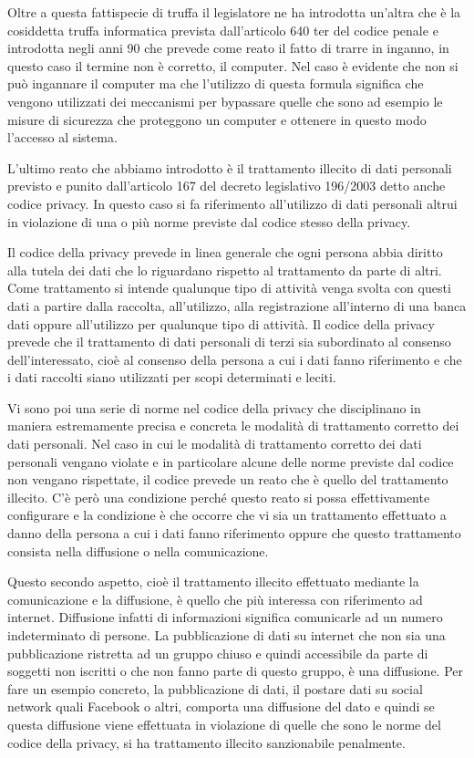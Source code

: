 Oltre a questa fattispecie di truffa il legislatore ne ha introdotta un'altra che è la cosiddetta truffa informatica prevista dall'articolo 640 ter del codice penale e introdotta negli anni 90 che prevede come reato il fatto di trarre in inganno, in questo caso il termine non è corretto, il computer. Nel caso è evidente che non si può ingannare il computer ma che l'utilizzo di questa formula significa che vengono utilizzati dei meccanismi per bypassare quelle che sono ad esempio le misure di sicurezza che proteggono un computer e ottenere in questo modo l'accesso al sistema.\par
L'ultimo reato che abbiamo introdotto è il trattamento illecito di dati personali previsto e punito dall'articolo 167 del decreto legislativo 196/2003 detto anche codice privacy. In questo caso si fa riferimento all'utilizzo di dati personali altrui in violazione di una o più norme previste dal codice stesso della privacy.\par
Il codice della privacy prevede in linea generale che ogni persona abbia diritto alla tutela dei dati che lo riguardano rispetto al trattamento da parte di altri. Come trattamento si intende qualunque tipo di attività venga svolta con questi dati a partire dalla raccolta, all'utilizzo, alla registrazione all'interno di una banca dati oppure all'utilizzo per qualunque tipo di attività. Il codice della privacy prevede che il trattamento di dati personali di terzi sia subordinato al consenso dell'interessato, cioè al consenso della persona a cui i dati fanno riferimento e che i dati raccolti siano utilizzati per scopi determinati e leciti. \par
Vi sono poi una serie di norme nel codice della privacy che disciplinano in maniera estremamente precisa e concreta le modalità di trattamento corretto dei dati personali. Nel caso in cui le modalità di trattamento corretto dei dati personali vengano violate e in particolare alcune delle norme previste dal codice non vengano rispettate, il codice prevede un reato che è quello del trattamento illecito. C'è però una condizione perché questo reato si possa effettivamente configurare e la condizione è che occorre che vi sia un trattamento effettuato a danno della persona a cui i dati fanno riferimento oppure che questo trattamento consista nella diffusione o nella comunicazione.\par
Questo secondo aspetto, cioè il trattamento illecito effettuato mediante la comunicazione e la diffusione, è quello che più interessa con riferimento ad internet. Diffusione infatti di informazioni significa comunicarle ad un numero indeterminato di persone. La pubblicazione di dati su internet che non sia una pubblicazione ristretta ad un gruppo chiuso e quindi accessibile da parte di soggetti non iscritti o che non fanno parte di questo gruppo, è una diffusione. Per fare un esempio concreto, la pubblicazione di dati, il postare dati su social network quali Facebook o altri, comporta una diffusione del dato e quindi se questa diffusione viene effettuata in violazione di quelle che sono le norme del codice della privacy, si ha trattamento illecito sanzionabile penalmente.\par
